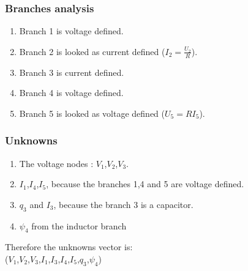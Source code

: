 \subsubsection{Branches analysis}

\begin{enumerate}
\item Branch 1 is voltage defined.
\item Branch 2 is looked as current defined ($I_{2}=\frac{U_{2}}{R}$).
\item Branch 3 is current defined.
\item Branch 4 is voltage defined.
\item Branch 5 is looked as voltage defined ($U_{5}=RI_{5}$).
\end{enumerate}
\subsubsection{Unknowns}
\begin{enumerate}
\item The voltage nodes : $V_{1}$,$V_{2}$,$V_{3}$.
\item $I_{1}$,$I_{4}$,$I_{5}$, because the branches 1,4 and 5 are voltage defined.
\item $q_{3}$ and $I_{3}$, because the branch 3 is a capacitor.
\item $\psi _{4}$ from the inductor branch
\end{enumerate}
Therefore the unknowns vector is:\\
($V_{1}$,$V_{2}$,$V_{3}$,$I_{1}$,$I_{3}$,$I_{4}$,$I_{5}$,$q_{3}$,$\psi _{4}$)
